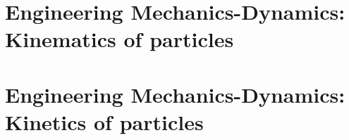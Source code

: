 \documentclass[]{book}
\begin{document}
\part{Engineering Mechanics-Dynamics: Kinematics of particles} %
	
	
\part{Engineering Mechanics-Dynamics: Kinetics of particles}
	
\end{document}
